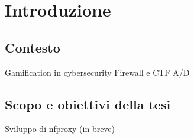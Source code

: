\chapter{Introduzione}

\section{Contesto}

Gamification in cybersecurity
Firewall e CTF A/D

\section{Scopo e obiettivi della tesi}

Sviluppo di nfproxy (in breve)
